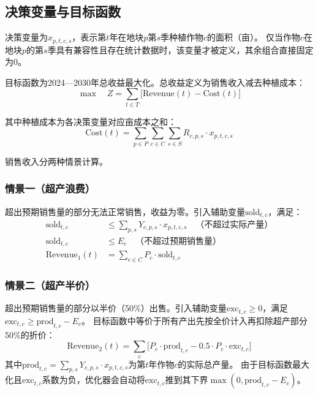 \documentclass[12pt,a4paper]{ctexart}
\begin{document}
\subsection{决策变量与目标函数}

决策变量为$x_{p,t,c,s}$，表示第$t$年在地块$p$第$s$季种植作物$c$的面积（亩）。
仅当作物$c$在地块$p$的第$s$季具有兼容性且存在统计数据时，该变量才被定义，其余组合直接固定为0。

目标函数为2024—2030年总收益最大化。总收益定义为销售收入减去种植成本：
\begin{equation}\label{eq:objective}
\max \quad Z = \sum_{t \in T} \bigl[ \text{Revenue}(t) - \text{Cost}(t) \bigr]
\end{equation}

其中种植成本为各决策变量对应亩成本之和：
\begin{equation}\label{eq:cost}
\text{Cost}(t) = \sum_{p \in P} \sum_{c \in C} \sum_{s \in S} R_{c,p,s} \cdot x_{p,t,c,s}
\end{equation}

销售收入分两种情景计算。

\subsubsection{情景一（超产浪费）}

超出预期销售量的部分无法正常销售，收益为零。引入辅助变量$\text{sold}_{t,c}$，满足：
\begin{align}
\text{sold}_{t,c} &\leq \sum_{p,s} Y_{c,p,s} \cdot x_{p,t,c,s} \quad \text{（不超过实际产量）} \label{eq:s1_prod}\\
\text{sold}_{t,c} &\leq E_c \quad \text{（不超过预期销售量）} \label{eq:s1_sales}\\
\text{Revenue}_1(t) &= \sum_{c \in C} P_c \cdot \text{sold}_{t,c} \label{eq:s1_rev}
\end{align}

\subsubsection{情景二（超产半价）}

超出预期销售量的部分以半价（50\%）出售。引入辅助变量$\text{exc}_{t,c} \geq 0$，满足$\text{exc}_{t,c} \geq \text{prod}_{t,c} - E_c$。
目标函数中等价于所有产出先按全价计入再扣除超产部分50\%的折价：
\begin{equation}\label{eq:s2_revenue}
\text{Revenue}_2(t) = \sum_{c} \bigl[ P_c \cdot \text{prod}_{t,c} - 0.5 \cdot P_c \cdot \text{exc}_{t,c} \bigr]
\end{equation}
其中$\text{prod}_{t,c} = \sum_{p,s} Y_{c,p,s} \cdot x_{p,t,c,s}$为第$t$年作物$c$的实际总产量。
由于目标函数最大化且$\text{exc}_{t,c}$系数为负，优化器会自动将$\text{exc}_{t,c}$推到其下界$\max(0, \text{prod}_{t,c} - E_c)$。
\end{document}
